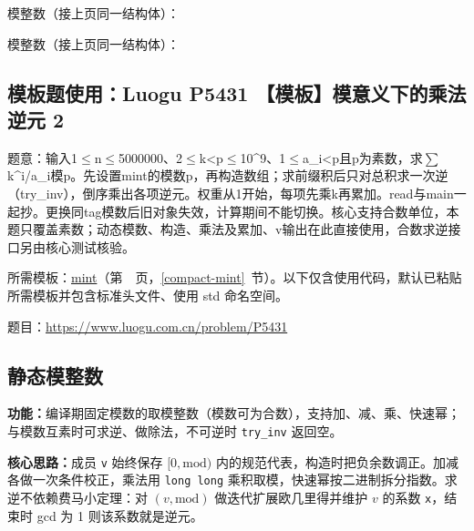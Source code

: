 \noindent 模整数（接上页同一结构体）：



\newpage

\noindent 模整数（接上页同一结构体）：



\Needspace{680pt}

\subsection*{模板题使用：Luogu P5431 【模板】模意义下的乘法逆元 2}

\label{usage-example-198}

题意：输入1$\le$n$\le$5000000、2$\le$k<p$\le$10\textasciicircum{}9、1$\le$a\_i<p且p为素数，求$\sum$k\textasciicircum{}i/a\_i模p。先设置mint的模数p，再构造数组；求前缀积后只对总积求一次逆（try\_inv），倒序乘出各项逆元。权重从1开始，每项先乘k再累加。read与main一起抄。更换同tag模数后旧对象失效，计算期间不能切换。核心支持合数单位，本题只覆盖素数；动态模数、构造、乘法及累加、v输出在此直接使用，合数求逆接口另由核心测试核验。

所需模板：\hyperref[compact-mint]{mint}（第~\pageref{compact-mint}~页，\ref{compact-mint}~节）。以下仅含使用代码，默认已粘贴所需模板并包含标准头文件、使用 std 命名空间。

题目：\url{https://www.luogu.com.cn/problem/P5431}



\newpage

\subsection{静态模整数}\label{compact-ModInt}

\noindent\textbf{功能：}\allowbreak 编译期固定模数的取模整数（模数可为合数），支持加、减、乘、快速幂；与模数互素时可求逆、做除法，不可逆时 \texttt{try\_inv} 返回空。

\textbf{核心思路：}\allowbreak 成员 \texttt{v} 始终保存 $[0,\mathrm{mod})$ 内的规范代表，构造时把负余数调正。加减各做一次条件校正，乘法用 \texttt{long long} 乘积取模，快速幂按二进制拆分指数。求逆不依赖费马小定理：对 $(v,\mathrm{mod})$ 做迭代扩展欧几里得并维护 $v$ 的系数 \texttt{x}，结束时 gcd 为 1 则该系数就是逆元。



